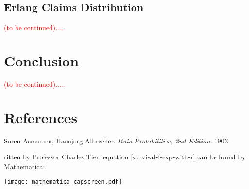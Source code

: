 \documentclass[12pt]{article}
\begin{document}
\subsection{Erlang Claims Distribution}
\textcolor{red}{(to be continued).....}


\newpage
\section{Conclusion}
\textcolor{red}{(to be continued).....}


\section{References}
\begingroup
\renewcommand{\section}[2]{}%
\begin{thebibliography}{}
 Soren Asmussen, Hansjorg Albrecher. \textit{Ruin Probabilities, 2nd Edition}. 1903.
\end{thebibliography}
\endgroup


\newpage
\section{Appendix}
Written by Professor Charles Tier, equation \eqref{survival-f-exp-with-r} can be found by Mathematica:\\
\vskip 0.5cm
\begin{flushleft}
\texttt{[image: mathematica\_capscreen.pdf]}
\end{flushleft}
\end{document}
